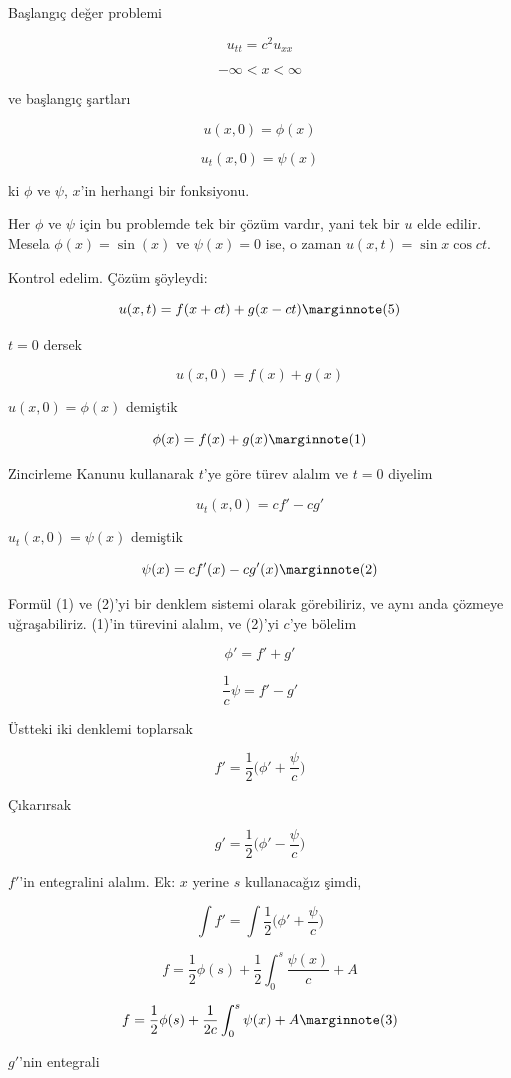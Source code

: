\documentclass[12pt,fleqn]{article}\usepackage{../../common}
\begin{document}
Başlangıç değer problemi 

$$ u_{tt} = c^2u_{xx} $$

$$ -\infty < x < \infty $$

ve başlangıç şartları 

$$ u(x,0) = \phi(x) $$

$$ u_t(x,0) = \psi(x) $$

ki $\phi$ ve $\psi$, $x$'in herhangi bir fonksiyonu. 

Her $\phi$ ve $\psi$ için bu problemde tek bir çözüm vardır, yani tek bir
$u$ elde edilir. Mesela $\phi(x) = \sin(x)$ ve $\psi(x) = 0$ ise, o zaman
$u(x,t) = \sin x \cos ct$. 

Kontrol edelim. Çözüm şöyleydi:

$$ u(x,t) = f(x+ct) + g(x-ct)  
\mlabel{5}
$$

$t=0$ dersek 

$$ u(x,0)  = f(x) + g(x) $$

$u(x,0) = \phi(x)$ demiştik

$$ \phi(x) = f(x) + g(x) 
\mlabel{1} 
$$

Zincirleme Kanunu kullanarak $t$'ye göre türev alalım ve $t=0$ diyelim

$$ u_t(x,0) = cf' - cg' $$

$u_t(x,0) = \psi(x)$ demiştik

$$ \psi(x) = cf'(x) - cg'(x) 
\mlabel{2} $$

Formül (1) ve (2)'yi bir denklem sistemi olarak görebiliriz, ve aynı anda
çözmeye uğraşabiliriz. (1)'in türevini alalım, ve (2)'yi $c$'ye bölelim

$$ \phi' = f' + g' $$

$$ \frac{1}{c}\psi = f' - g' $$

Üstteki iki denklemi toplarsak

$$ f' = \frac{1}{2} \bigg( \phi' + \frac{\psi}{c}  \bigg) $$

Çıkarırsak

$$ g' = \frac{1}{2}  \bigg( \phi' - \frac{\psi}{c}  \bigg) $$


$f'$'in entegralini alalım. Ek: $x$ yerine $s$ kullanacağız şimdi,

$$ \int f' = \int \frac{1}{2} \bigg( \phi' + \frac{\psi}{c}  \bigg) $$

$$ f = \frac{1}{2}\phi(s) + \frac{1}{2}\int_0^s \frac{\psi(x)}{c} + A$$

$$ f = \frac{1}{2}\phi(s) + \frac{1}{2c} \int_0^s \psi(x) + A 
\mlabel{3}
$$

$g'$'nin entegrali
\end{document}
